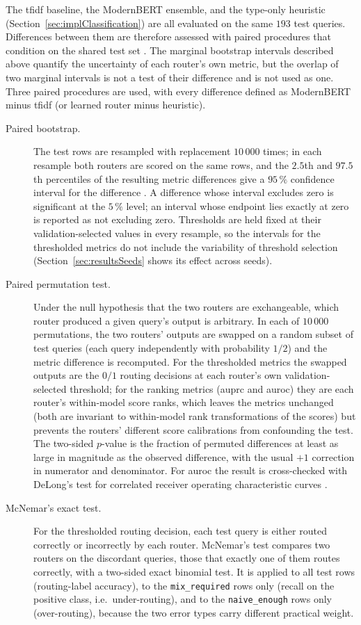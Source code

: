 \documentclass[english, bibtex]{kththesis}               %
\numberwithin{listing}{chapter}
\begin{document}
The \gls{tfidf} baseline, the ModernBERT ensemble, and the type-only heuristic (Section~\ref{sec:implClassification}) are all evaluated on the same $193$ test queries. Differences between them are therefore assessed with paired procedures that condition on the shared test set \cite{dietterich1998}. The marginal bootstrap intervals described above quantify the uncertainty of each router's own metric, but the overlap of two marginal intervals is not a test of their difference and is not used as one. Three paired procedures are used, with every difference defined as ModernBERT minus \gls{tfidf} (or learned router minus heuristic).

\begin{description}
\item[Paired bootstrap.] The test rows are resampled with replacement $10\,000$ times; in each resample both routers are scored on the same rows, and the $2.5$th and $97.5$th percentiles of the resulting metric differences give a $95\,\%$ confidence interval for the difference \cite{efron1979bootstrap}. A difference whose interval excludes zero is significant at the $5\,\%$ level; an interval whose endpoint lies exactly at zero is reported as not excluding zero. Thresholds are held fixed at their validation-selected values in every resample, so the intervals for the thresholded metrics do not include the variability of threshold selection (Section~\ref{sec:resultsSeeds} shows its effect across seeds).
\item[Paired permutation test.] Under the null hypothesis that the two routers are exchangeable, which router produced a given query's output is arbitrary. In each of $10\,000$ permutations, the two routers' outputs are swapped on a random subset of test queries (each query independently with probability $1/2$) and the metric difference is recomputed. For the thresholded metrics the swapped outputs are the $0/1$ routing decisions at each router's own validation-selected threshold; for the ranking metrics (\gls{auprc} and \gls{auroc}) they are each router's within-model score ranks, which leaves the metrics unchanged (both are invariant to within-model rank transformations of the scores) but prevents the routers' different score calibrations from confounding the test. The two-sided $p$-value is the fraction of permuted differences at least as large in magnitude as the observed difference, with the usual $+1$ correction in numerator and denominator. For \gls{auroc} the result is cross-checked with DeLong's test for correlated receiver operating characteristic curves \cite{delong1988}.
\item[McNemar's exact test.] For the thresholded routing decision, each test query is either routed correctly or incorrectly by each router. McNemar's test \cite{mcnemar1947} compares two routers on the discordant queries, those that exactly one of them routes correctly, with a two-sided exact binomial test. It is applied to all test rows (routing-label accuracy), to the \texttt{mix\_required} rows only (recall on the positive class, i.e.\ under-routing), and to the \texttt{naive\_enough} rows only (over-routing), because the two error types carry different practical weight.
\end{description}
\end{document}
